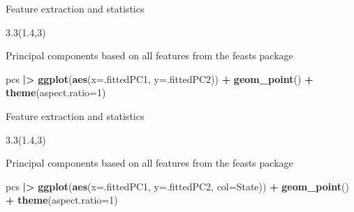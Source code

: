 \documentclass[
  14pt,
  ignorenonframetext,
  aspectratio=169,
]{beamer}
\newenvironment{Shaded}{\begin{snugshade}}{\end{snugshade}}
\newcommand{\AttributeTok}[1]{\textcolor[rgb]{0.13,0.29,0.53}{#1}}
\newcommand{\DecValTok}[1]{\textcolor[rgb]{0.00,0.00,0.81}{#1}}
\newcommand{\FunctionTok}[1]{\textcolor[rgb]{0.13,0.29,0.53}{\textbf{#1}}}
\newcommand{\NormalTok}[1]{#1}
\newcommand{\SpecialCharTok}[1]{\textcolor[rgb]{0.81,0.36,0.00}{\textbf{#1}}}
\renewenvironment{Shaded}{\vspace*{0.15cm}\color{black}\fontsize{10}{10}\sf\begin{snugshade}\color{black}}{\end{snugshade}}
\begin{document}
\begin{frame}[fragile]{Feature extraction and statistics}
\protect{}\label{feature-extraction-and-statistics-7}
\fontsize{9}{9}\sf

\begin{textblock}{3.3}(1.4,3)
\begin{alertblock}{}\fontsize{10}{12}\sf
Principal components based on all features from the feasts package
\end{alertblock}
\end{textblock}

\begin{Shaded}
\begin{Highlighting}[]
\NormalTok{pcs }\SpecialCharTok{|\textgreater{}} \FunctionTok{ggplot}\NormalTok{(}\FunctionTok{aes}\NormalTok{(}\AttributeTok{x=}\NormalTok{.fittedPC1, }\AttributeTok{y=}\NormalTok{.fittedPC2)) }\SpecialCharTok{+}
  \FunctionTok{geom\_point}\NormalTok{() }\SpecialCharTok{+} \FunctionTok{theme}\NormalTok{(}\AttributeTok{aspect.ratio=}\DecValTok{1}\NormalTok{)}
\end{Highlighting}
\end{Shaded}

\vspace*{10cm}
\end{frame}

\begin{frame}[fragile]{Feature extraction and statistics}
\protect{}\label{feature-extraction-and-statistics-8}
\fontsize{9}{9}\sf

\begin{textblock}{3.3}(1.4,3)
\begin{alertblock}{}\fontsize{10}{12}\sf
Principal components based on all features from the feasts package
\end{alertblock}
\end{textblock}

\begin{Shaded}
\begin{Highlighting}[]
\NormalTok{pcs }\SpecialCharTok{|\textgreater{}} \FunctionTok{ggplot}\NormalTok{(}\FunctionTok{aes}\NormalTok{(}\AttributeTok{x=}\NormalTok{.fittedPC1, }\AttributeTok{y=}\NormalTok{.fittedPC2, }\AttributeTok{col=}\NormalTok{State)) }\SpecialCharTok{+}
  \FunctionTok{geom\_point}\NormalTok{() }\SpecialCharTok{+} \FunctionTok{theme}\NormalTok{(}\AttributeTok{aspect.ratio=}\DecValTok{1}\NormalTok{)}
\end{Highlighting}
\end{Shaded}

\vspace*{10cm}
\end{frame}
\end{document}
